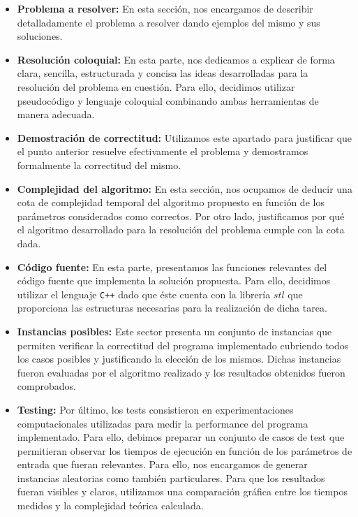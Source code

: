 \documentclass[10pt, a4paper]{article}
\begin{document}
\begin{itemize}
\item \textbf{Problema a resolver:} En esta sección, nos encargamos de describir detalladamente el problema a resolver dando ejemplos del mismo y sus soluciones.
\item \textbf{Resolución coloquial:} En esta parte, nos dedicamos a explicar de forma clara, sencilla, estructurada y concisa las ideas desarrolladas para la resolución del problema en cuestión. Para ello, decidimos utilizar pseudocódigo y lenguaje coloquial combinando ambas herramientas de manera adecuada.
\item \textbf{Demostración de correctitud:} Utilizamos este apartado para justificar que el punto anterior resuelve efectivamente el problema y demostramos formalmente la correctitud del mismo.
\item \textbf{Complejidad del algoritmo:} En esta sección, nos ocupamos de deducir una cota de complejidad temporal del algoritmo propuesto en función de los parámetros considerados como correctos. Por otro lado, justificamos por qué el algoritmo desarrollado para la resolución del problema cumple con la cota dada.
\item \textbf{Código fuente:} En esta parte, presentamos las funciones relevantes del código fuente que implementa la solución propuesta. Para ello, decidimos utilizar el lenguaje \verb*#C++# dado que éste cuenta con la librería $stl$ que proporciona las estructuras necesarias para la realización de dicha tarea.
\item \textbf{Instancias posibles:} Este sector presenta un conjunto de instancias que permiten verificar la correctitud del programa implementado cubriendo todos los casos posibles y justificando la elección de los mismos. Dichas instancias fueron evaluadas por el algoritmo realizado y los resultados obtenidos fueron comprobados.
\item \textbf{Testing:} Por último, los tests consistieron en experimentaciones computacionales utilizadas para medir la performance del programa implementado. Para ello, debimos preparar un conjunto de casos de test que permitieran observar los tiempos de ejecución en función de los parámetros de entrada que fueran relevantes. Para ello, nos encargamos de generar instancias aleatorias como también particulares. Para que los resultados fueran visibles y claros, utilizamos una comparación gráfica entre los tiempos medidos y la complejidad teórica calculada.
\end{itemize}
\newpage
\end{document}

